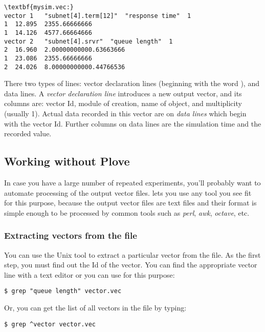 \begin{Verbatim}[commandchars=\\\{\}]
\textbf{mysim.vec:}
vector 1   "subnet[4].term[12]"  "response time"  1
1  12.895  2355.66666666
1  14.126  4577.66664666
vector 2   "subnet[4].srvr"  "queue length"  1
2  16.960  2.00000000000.63663666
1  23.086  2355.66666666
2  24.026  8.00000000000.44766536
\end{Verbatim}


There two types of lines: vector declaration lines (beginning with
the word ), and data lines.
A \textit{vector declaration line} introduces a new output vector, and
its columns are: vector Id, module of creation, name of 
object, and multiplicity (usually 1). Actual data recorded in this
vector are on \textit{data lines} which begin with the vector Id.
Further columns on data lines are the simulation time and the recorded value.




\subsection{Working without Plove}

In case you have a large number of repeated experiments, you'll probably
want to automate processing of the output vector files. {\opp} lets you
use any tool you see fit for this purpose, because the output
vector files are text files and their format is simple enough to be
processed by common tools such as \textit{perl}, \textit{awk},
\textit{octave}, etc.

\subsubsection{Extracting vectors from the file}

You can use the Unix  tool to extract a particular vector
from the file. As the first step, you must find out the Id of the
vector. You can find the appropriate vector line with a text editor or
you can use  for this purpose:

\begin{verbatim}
$ grep "queue length" vector.vec
\end{verbatim}

Or, you can get the list of all vectors in the file by typing:

\begin{verbatim}
$ grep ^vector vector.vec
\end{verbatim}

